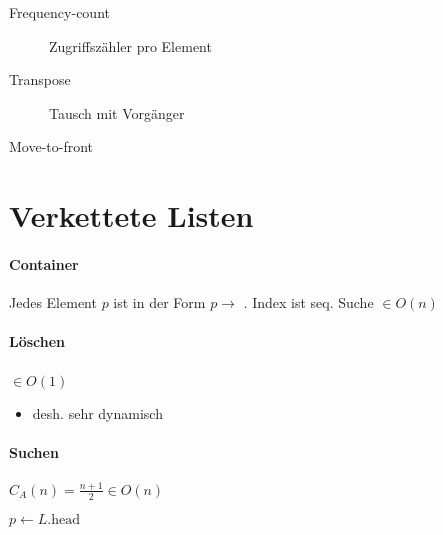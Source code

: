 \begin{description}
  \item [Frequency-count] Zugriffszähler pro Element

  \item [Transpose] Tausch mit Vorgänger

  \item [Move-to-front]
\end{description}

\section{Verkettete Listen}

\paragraph{Container} Jedes Element $p$ ist in der Form $p \rightarrow$ . Index ist seq. Suche $\in O(n)$

\paragraph{Löschen} $\in O(1)$\

\begin{algorithm}[H]


\end{algorithm}

\begin{itemize}
  \item desh. sehr dynamisch
\end{itemize}

\paragraph{Suchen} $C_A(n) = \frac{n + 1}{2} \in O(n)$

\begin{algorithm}[H]


  $p \leftarrow L.\text{head}$

\end{algorithm}

